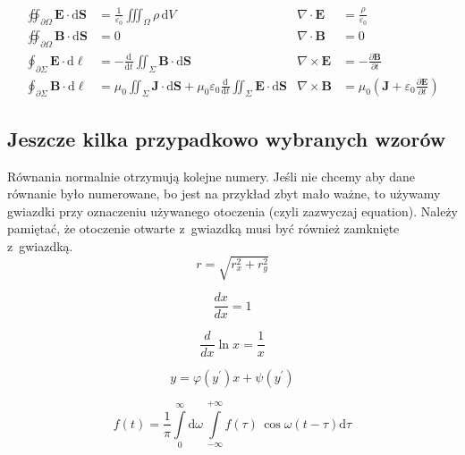 \begin{align}
    \oiint\nolimits_{\partial \Omega} \pmb{E} \cdot \mathrm{d}\pmb{S} &= \frac{1}{\varepsilon_0} \iiint\nolimits_\Omega
    \rho \, \mathrm{d}V &  \nabla \cdot \pmb{E} &= \frac {\rho} {\varepsilon_0} \label{eq:maxwell1} \\
    \oiint\nolimits_{\partial \Omega} \pmb{B} \cdot \mathrm{d}\pmb{S} &= 0 & \nabla \cdot \pmb{B} &= 0
    \label{eq:maxwell2} \\
    \oint\nolimits_{\partial \Sigma} \pmb{E} \cdot \mathrm{d}\boldsymbol{\ell} &= -\frac{\mathrm{d}}{\mathrm{d}t}\iint
    \nolimits_{\Sigma}\pmb{B}\cdot\mathrm{d}\pmb{S} & \nabla \times \pmb{E} &= -\frac{\partial \pmb{B}}{\partial t}
    \label{eq:maxwell3} \\
    \oint\nolimits_{\partial \Sigma} \pmb{B} \cdot \mathrm{d}\boldsymbol{\ell} &= \mu_0 \iint\nolimits_{\Sigma} \pmb{J}
    \cdot \mathrm{d}\pmb{S} + \mu_0 \varepsilon_0 \frac{\mathrm{d}}{\mathrm{d}t} \iint\nolimits_{\Sigma} \pmb{E} \cdot
    \mathrm{d}\pmb{S} & \nabla \times \pmb{B} &= \mu_0
    \left(\pmb{J} + \varepsilon_0 \frac{\partial \pmb{E}} {\partial t} \right) \label{eq:maxwell4}
\end{align}

\subsection{Jeszcze kilka przypadkowo wybranych wzorów}
Równania normalnie otrzymują kolejne numery. Jeśli nie chcemy aby dane równanie było numerowane, bo jest na przykład
zbyt mało ważne, to używamy gwiazdki przy oznaczeniu używanego otoczenia (czyli zazwyczaj equation). Należy pamiętać, że
otoczenie otwarte z~gwiazdką musi być również zamknięte z~gwiazdką.
\begin{equation*}
    r = \sqrt{r_x^2 + r_y^2}
\end{equation*}

\begin{equation}
    \frac{dx}{dx} = 1
\end{equation}

\begin{equation}
    \frac{d}{dx} \ln x = \frac{1}{x}
\end{equation}

\begin{equation}
    y = \varphi  (y^\prime)x + \psi(y^\prime)
\end{equation}

\begin{equation}
    f(t) = \frac{1}{\pi} \int\limits_0^\infty \mathrm{d} \omega \,\int\limits_{-\infty}^{+\infty} f(\tau)\, \cos
    \omega (t-\tau)  \mathrm{d}\tau
\end{equation}

